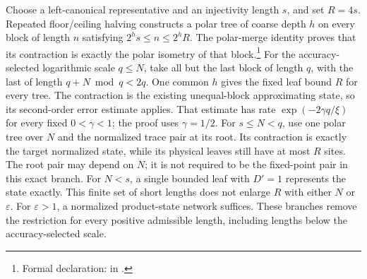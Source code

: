 \documentclass{article}
\begin{document}
Choose a left-canonical representative and an injectivity length $s$, and set
$R=4s$. Repeated floor/ceiling halving constructs a polar tree of coarse depth
$h$ on every block of length $n$ satisfying $2^h s\le n\le2^h R$.
The polar-merge identity proves that its contraction is exactly the polar
isometry of that block.\footnote{Formal declaration:
    in .}
For the accuracy-selected logarithmic scale $q\le N$, take all but the last
block of length $q$, with the last of length $q+N\bmod q<2q$.
One common $h$ gives the fixed leaf bound $R$ for every tree.
The contraction is the existing unequal-block approximating state, so its
second-order error estimate applies. That estimate has rate
$\exp(-2\gamma q/\xi)$ for every fixed $0<\gamma<1$; the proof uses
$\gamma=1/2$.
For $s\le N<q$, use one polar tree over $N$ and the normalized trace pair
at its root. Its contraction is exactly the target normalized state, while
its physical leaves still have at most $R$ sites. The root pair may depend
on $N$; it is not required to be the fixed-point pair in this exact branch.
For $N<s$, a single bounded leaf with $D'=1$ represents the state exactly.
This finite set of short lengths does not enlarge $R$ with either $N$ or
$\varepsilon$. For $\varepsilon>1$, a normalized product-state network suffices.
These branches remove the restriction for every positive admissible length,
including lengths below the accuracy-selected scale.



\end{document}

